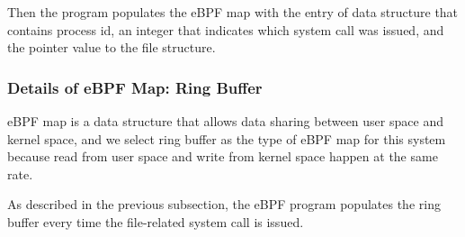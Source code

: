 Then the program populates the eBPF map with the entry of data structure that
contains process id, an integer that indicates which system call was issued,
and the pointer value to the file structure.

\subsubsection{Details of eBPF Map: Ring Buffer}
eBPF map is a data structure that allows data sharing between user space and kernel space, and
we select ring buffer as the type of eBPF map for this system because read from user space
and write from kernel space happen at the same rate.

As described in the previous subsection, the eBPF program populates the ring buffer
every time the file-related system call is issued.




